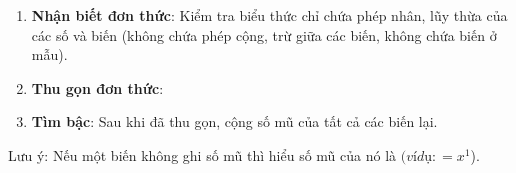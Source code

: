 \begin{enumerate}
\item \textbf{Nhận biết đơn thức}: Kiểm tra biểu thức chỉ chứa phép nhân, lũy thừa của các số và biến (không chứa phép cộng, trừ giữa các biến, không chứa biến ở mẫu).
\item \textbf{Thu gọn đơn thức}:
\item \textbf{Tìm bậc}: Sau khi đã thu gọn, cộng số mũ của tất cả các biến lại.
\end{enumerate}
Lưu ý: Nếu một biến không ghi số mũ thì hiểu số mũ của nó là $ (ví dụ:  = x^1$).
